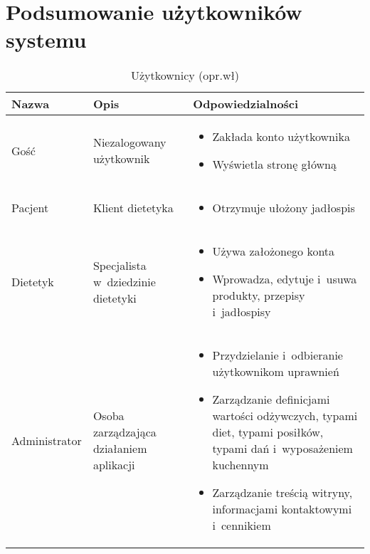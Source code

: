 \section{Podsumowanie użytkowników systemu}\label{sec:users-summary}
\noindent
\begin{minipage}{\textwidth}
    \begin{table}[H]
        \centering\caption{Użytkownicy (opr.wł)\label{tabela:uzytkownicy}}
        \begin{tabular}{|P{.15\textwidth}|P{.25\textwidth}|P{.5\textwidth}|}

            \hline
            Nazwa & Opis & Odpowiedzialności\\

            \hline
            Gość &
            Niezalogowany użytkownik &
            \begin{itemize}
                \item Zakłada konto użytkownika
                \item Wyświetla stronę główną
            \end{itemize} \\
            \hline
            Pacjent &
            Klient dietetyka &
            \begin{itemize}
                \item Otrzymuje ułożony jadłospis
            \end{itemize} \\
            \hline
            Dietetyk &
            Specjalista w~dziedzinie dietetyki &
            \begin{itemize}
                \item Używa założonego konta
                \item Wprowadza, edytuje i~usuwa produkty, przepisy i~jadłospisy
            \end{itemize} \\
            \hline
            Administrator &
            Osoba zarządzająca działaniem aplikacji &
            \begin{itemize}
                \item Przydzielanie i~odbieranie użytkownikom uprawnień
                \item Zarządzanie definicjami wartości odżywczych, typami diet, typami posiłków, typami dań i~wyposażeniem kuchennym
                \item Zarządzanie treścią witryny, informacjami kontaktowymi i~cennikiem
            \end{itemize} \\
            \hline
        \end{tabular}
    \end{table}
\end{minipage}

